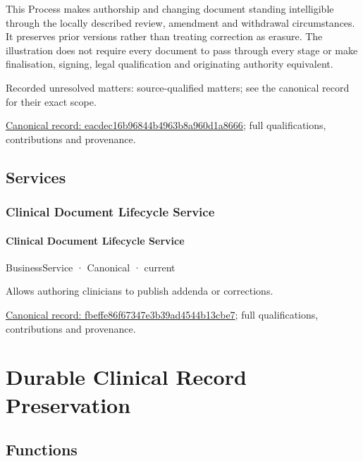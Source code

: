 This Process makes authorship and changing document standing intelligible through the locally described review, amendment and withdrawal circumstances. It preserves prior versions rather than treating correction as erasure. The illustration does not require every document to pass through every stage or make finalisation, signing, legal qualification and originating authority equivalent.


{\small Recorded unresolved matters: source-qualified matters; see the canonical record for their exact scope.}\par
{\footnotesize \href{../../../../continuum/business/business-process/eacdec16b96844b4963b8a960d1a8666.md}{Canonical record: eacdec16b96844b4963b8a960d1a8666}; full qualifications, contributions and provenance.}\par
\subsection{Services}

\subsubsection{Clinical Document Lifecycle Service}

\paragraph{Clinical Document Lifecycle Service}

\label{element:fbeffe86f67347e3b39ad4544b13cbe7}
{\small BusinessService · Canonical · current}\par

Allows authoring clinicians to publish addenda or corrections.


{\footnotesize \href{../../../../continuum/business/business-service/fbeffe86f67347e3b39ad4544b13cbe7.md}{Canonical record: fbeffe86f67347e3b39ad4544b13cbe7}; full qualifications, contributions and provenance.}\par
\section{Durable Clinical Record Preservation}

\subsection{Functions}


